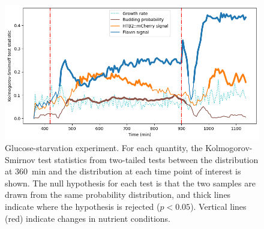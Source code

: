 \begin{figure}
  \centering
  \includegraphics[width=\textwidth]{19972_ks_highlight}
  \caption{
    Glucose-starvation experiment.
    For each quantity, the Kolmogorov-Smirnov test statistics from two-tailed tests between the distribution at \SI{360}{\minute} and the distribution at each time point of interest is shown.
    The null hypothesis for each test is that the two samples are drawn from the same probability distribution, and thick lines indicate where the hypothesis is rejected ($p < 0.05$).
    Vertical lines (red) indicate changes in nutrient conditions.
  }
  \label{fig:biology-starvation-ks}
\end{figure}


